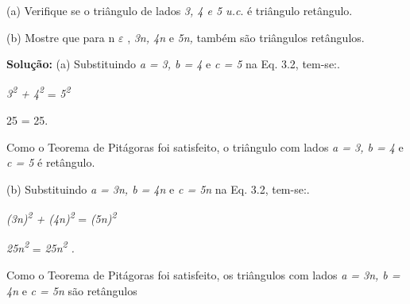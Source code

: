 \begin{texemplo}
(a) Verifique se o triângulo de lados \textit{3, 4 e 5 u.c}. é triângulo retângulo.

(b) Mostre que para n $ \varepsilon $  ,  \textit{3n, 4n }e\textit{ 5n,} também são triângulos retângulos.

\textbf{Solução: }(a) Substituindo \textit{a = 3, b = 4 }e\textit{ c = 5} na Eq. 3.2, tem-se:.

\textit{3\textsuperscript{2} + 4\textsuperscript{2} }= \textit{ 5\textsuperscript{2}  }

25 = 25.

Como o Teorema de Pitágoras foi satisfeito, o triângulo com lados \textit{a = 3, b = 4 }e\textit{ c = 5} é retângulo.

(b) Substituindo \textit{a = 3n, b = 4n }e\textit{ c = 5n} na Eq. 3.2, tem-se:.

\textit{(3n)\textsuperscript{2} + (4n)\textsuperscript{2} }= \textit{ (5n)\textsuperscript{2}  }

\textit{25n\textsuperscript{2}  }= \textit{ 25n\textsuperscript{2}  . }

Como o Teorema de Pitágoras foi satisfeito, os triângulos com lados \textit{a = 3n, b = 4n }e\textit{ c = 5n} são retângulos \textit{\qedsymbol}
\end{texemplo}

